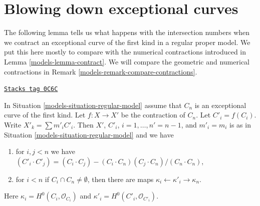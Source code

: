 \section{Blowing down exceptional curves}
\label{models-section-contract}
The following lemma tells us what happens with the intersection
numbers when we contract an exceptional curve of the first kind
in a regular proper model. We put this here mostly to compare with
the numerical contractions introduced in Lemma \ref{models-lemma-contract}.
We will compare the geometric and numerical contractions in
Remark \ref{models-remark-compare-contractions}.

\begin{lemma}
\label{models-lemma-blowdown-regular-model}
\href{https://stacks.math.columbia.edu/tag/0C6C}{\texttt{Stacks tag 0C6C}}

In Situation \ref{models-situation-regular-model} assume that $C_n$ is
an exceptional curve of the first kind. Let $f : X \to X'$ be the
contraction of $C_n$. Let $C'_i = f(C_i)$. Write $X'_k = \sum m'_i C'_i$.
Then $X'$, $C'_i$, $i = 1, \ldots, n' = n - 1$, and $m'_i = m_i$
is as in Situation \ref{models-situation-regular-model} and we have
\begin{enumerate}
\item for $i, j < n$ we have
$(C'_i \cdot C'_j) =
(C_i \cdot C_j) - (C_i \cdot C_n) (C_j \cdot C_n) /(C_n \cdot C_n)$,
\item for $i < n$ if $C_i \cap C_n \not = \emptyset$, then there are
maps $\kappa_i \leftarrow \kappa'_i \rightarrow \kappa_n$.
\end{enumerate}
Here $\kappa_i = H^0(C_i, \mathcal{O}_{C_i})$ and
$\kappa'_i = H^0(C'_i, \mathcal{O}_{C'_i})$.
\end{lemma}

